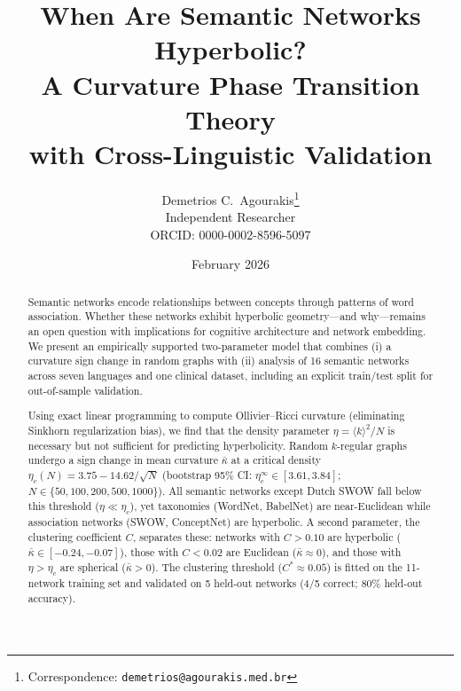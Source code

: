 \documentclass[11pt,a4paper]{article}
\title{When Are Semantic Networks Hyperbolic?\\A Curvature Phase Transition Theory\\with Cross-Linguistic Validation}
\author{Demetrios C.\ Agourakis\thanks{Correspondence: \texttt{demetrios@agourakis.med.br}}\\
  \small Independent Researcher\\
  \small ORCID: 0000-0002-8596-5097
}
\date{February 2026}
\newcommand{\kbar}{\bar{\kappa}}
\newcommand{\kavg}{\langle k \rangle}
\newcommand{\etac}{\eta_c}
\newcommand{\Cstar}{C^*}
\begin{document}
\maketitle

\begin{abstract}
Semantic networks encode relationships between concepts through patterns of word association. Whether these networks exhibit hyperbolic geometry---and why---remains an open question with implications for cognitive architecture and network embedding. We present an empirically supported two-parameter model that combines (i) a curvature sign change in random graphs with (ii) analysis of 16 semantic networks across seven languages and one clinical dataset, including an explicit train/test split for out-of-sample validation.

Using exact linear programming to compute Ollivier--Ricci curvature (eliminating Sinkhorn regularization bias), we find that the density parameter $\eta = \kavg^2/N$ is necessary but not sufficient for predicting hyperbolicity. Random $k$-regular graphs undergo a sign change in mean curvature $\kbar$ at a critical density $\etac(N) = 3.75 - 14.62/\sqrt{N}$ (bootstrap 95\% CI: $\eta_c^\infty \in [3.61,3.84]$; $N \in \{50, 100, 200, 500, 1000\}$). All semantic networks except Dutch SWOW fall below this threshold ($\eta \ll \etac$), yet taxonomies (WordNet, BabelNet) are near-Euclidean while association networks (SWOW, ConceptNet) are hyperbolic. A second parameter, the clustering coefficient $C$, separates these: networks with $C > 0.10$ are hyperbolic ($\kbar \in [-0.24, -0.07]$), those with $C < 0.02$ are Euclidean ($\kbar \approx 0$), and those with $\eta > \etac$ are spherical ($\kbar > 0$). The clustering threshold ($\Cstar \approx 0.05$) is fitted on the 11-network training set and validated on 5 held-out networks (4/5 correct; 80\% held-out accuracy).


\end{abstract}
\end{document}
